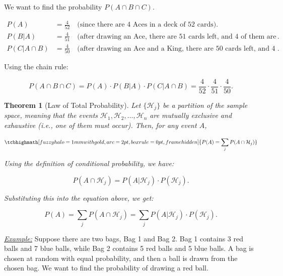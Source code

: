 \documentclass[a4paper,10pt]{article}
\newtheorem{theorem}{Theorem}
\newcommand{\equationgold}[1]{
  \tcbhighmath[fuzzy halo=1mm with gold,arc=2pt,boxrule=0pt,frame hidden]{#1}
}
\newcommand{\hlti}[1]{\colorbox{color1}{#1}}
\begin{document}
We want to find the probability $ P(A \cap B \cap C) $.

\begin{align*}
    P(A) &= \frac{4}{52} \quad \text{(since there are 4 Aces in a deck of 52 cards)}. \\
    P(B | A) &= \frac{4}{51} \quad \text{(after drawing an Ace, there are 51 cards left, and 4 of them are Kings)}. \\
    P(C | A \cap B) &= \frac{4}{50} \quad \text{(after drawing an Ace and a King, there are 50 cards left, and 4 of them are Queens)}.
\end{align*}

Using the chain rule:

$$
P(A \cap B \cap C) = P(A) \cdot P(B | A) \cdot P(C | A \cap B) = \frac{4}{52} \cdot \frac{4}{51} \cdot \frac{4}{50}.
$$


\begin{theorem}[\hlti{Law of Total Probability}]
    Let $\{\mathcal{H}_j\}$ be a partition of the sample space, meaning that the events $\mathcal{H}_1, \mathcal{H}_2, \ldots, \mathcal{H}_n$ are mutually exclusive and exhaustive (i.e., one of them must occur). Then, for any event $A$,

    \begin{equation}
    \equationgold{
      P(A) = \sum_j P(A \cap \mathcal{H}_j)
    }
    \end{equation}

    Using the definition of conditional probability, we have:

    \begin{equation}
        P(A \cap \mathcal{H}_j) = P(A | \mathcal{H}_j) \cdot P(\mathcal{H}_j).
    \end{equation}

    Substituting this into the equation above, we get:

    \begin{equation}
        P(A) = \sum_j P(A \cap \mathcal{H}_j) = \sum_j P(A | \mathcal{H}_j) \cdot P(\mathcal{H}_j).
    \end{equation}
\end{theorem}

\noindent\textit{\underline{Example:}} Suppose there are two bags, Bag 1 and Bag 2. Bag 1 contains 3 red balls and 7 blue balls, while Bag 2 contains 5 red balls and 5 blue balls. A bag is chosen at random with equal probability, and then a ball is drawn from the chosen bag. We want to find the probability of drawing a red ball.
\end{document}
